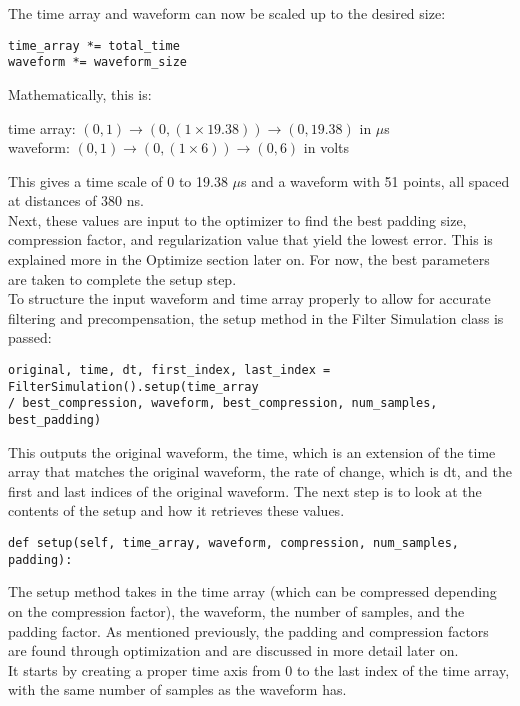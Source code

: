 \documentclass[11pt, a4paper]{article}
\theoremstyle{definition}
\numberwithin{equation}{section}
\begin{document}
The time array and waveform can now be scaled up to the desired size:

\begin{verbatim}
time_array *= total_time
waveform *= waveform_size
\end{verbatim}
Mathematically, this is:
\begin{center}
    time array: $(0, 1) \rightarrow (0, (1 \times 19.38 )) \rightarrow (0, 19.38)$ in $\mu$s
    \\
    waveform: $(0, 1) \rightarrow (0, (1 \times 6)) \rightarrow (0, 6)$ in volts
\end{center}

This gives a time scale of 0 to 19.38 $\mu$s and a waveform with 51 points, all spaced at distances of 380 ns.
\\
Next, these values are input to the optimizer to find the best padding size, compression factor, and regularization value that yield the lowest error. This is explained more in the Optimize section later on. For now, the best parameters are taken to complete the setup step.
\\
To structure the input waveform and time array properly to allow for accurate filtering and precompensation, the setup method in the Filter Simulation class is passed:

\begin{verbatim}
original, time, dt, first_index, last_index = FilterSimulation().setup(time_array 
/ best_compression, waveform, best_compression, num_samples, best_padding)
\end{verbatim}

This outputs the original waveform, the time, which is an extension of the time array that matches the original waveform, the rate of change, which is dt, and the first and last indices of the original waveform.  The next step is to look at the contents of the setup and how it retrieves these values.

\begin{verbatim}
def setup(self, time_array, waveform, compression, num_samples, padding):
\end{verbatim}

The setup method takes in the time array (which can be compressed depending on the compression factor), the waveform, the number of samples, and the padding factor. As mentioned previously, the padding and compression factors are found through optimization and are discussed in more detail later on.
\\
It starts by creating a proper time axis from 0 to the last index of the time array, with the same number of samples as the waveform has.
\end{document}
